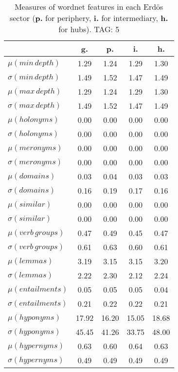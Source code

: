 \begin{table}[h!]
\begin{center}
\begin{tabular}{| l | c | c | c | c |}\hline
 & g. & p. & i. & h. \\\hline
$\mu(min\,depth)$ & 1.29  & 1.24  & 1.29  & 1.30 \\\hline
$\sigma(min\,depth)$ & 1.49  & 1.52  & 1.47  & 1.49 \\\hline
$\mu(max\,depth)$ & 1.29  & 1.24  & 1.29  & 1.30 \\\hline
$\sigma(max\,depth)$ & 1.49  & 1.52  & 1.47  & 1.49 \\\hline
$\mu(holonyms)$ & 0.00  & 0.00  & 0.00  & 0.00 \\\hline
$\sigma(holonyms)$ & 0.00  & 0.00  & 0.00  & 0.00 \\\hline
$\mu(meronyms)$ & 0.00  & 0.00  & 0.00  & 0.00 \\\hline
$\sigma(meronyms)$ & 0.00  & 0.00  & 0.00  & 0.00 \\\hline
$\mu(domains)$ & 0.03  & 0.04  & 0.03  & 0.03 \\\hline
$\sigma(domains)$ & 0.16  & 0.19  & 0.17  & 0.16 \\\hline
$\mu(similar)$ & 0.00  & 0.00  & 0.00  & 0.00 \\\hline
$\sigma(similar)$ & 0.00  & 0.00  & 0.00  & 0.00 \\\hline
$\mu(verb\,groups)$ & 0.47  & 0.49  & 0.45  & 0.47 \\\hline
$\sigma(verb\,groups)$ & 0.61  & 0.63  & 0.60  & 0.61 \\\hline
$\mu(lemmas)$ & 3.19  & 3.15  & 3.15  & 3.20 \\\hline
$\sigma(lemmas)$ & 2.22  & 2.30  & 2.12  & 2.24 \\\hline
$\mu(entailments)$ & 0.05  & 0.05  & 0.05  & 0.04 \\\hline
$\sigma(entailments)$ & 0.21  & 0.22  & 0.22  & 0.21 \\\hline
$\mu(hyponyms)$ & 17.92  & 16.20  & 15.05  & 18.68 \\\hline
$\sigma(hyponyms)$ & 45.45  & 41.26  & 33.75  & 48.00 \\\hline
$\mu(hypernyms)$ & 0.63  & 0.60  & 0.64  & 0.63 \\\hline
$\sigma(hypernyms)$ & 0.49  & 0.49  & 0.49  & 0.49 \\\hline
\end{tabular}
\caption{Measures of wordnet features in each Erd\"os sector ({{\bf p.}} for periphery, {{\bf i.}} for intermediary, {{\bf h.}} for hubs). TAG: 5}
\end{center}
\end{table}